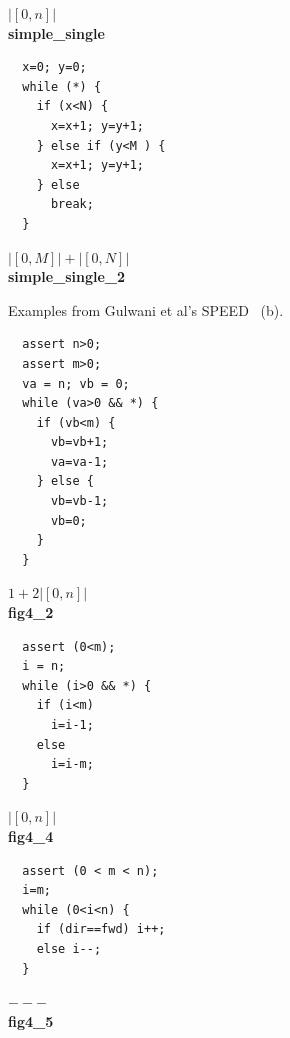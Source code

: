 \documentclass[nocopyrightspace,preprint,pldi]{sigplanconf-pldi15}
\begin{document}
{\begin{figure}
\begin{minipage}[b]{\progwidth}
\begin{center}
$|[0,n]|$
\\[.7\baselineskip]
      {\bf simple\_single}
    \end{center}
  \end{minipage}
%
%
  \begin{minipage}[b]{\progwidth}
    \begin{center}
   \begin{lstlisting}
  x=0; y=0;
  while (*) {
    if (x<N) {
      x=x+1; y=y+1;
    } else if (y<M ) {
      x=x+1; y=y+1;
    } else
      break;
  }
   \end{lstlisting}

$|[0, M]| + |[0, N]|$
\\[.7\baselineskip]
      {\bf simple\_single\_2}
    \end{center}
  \end{minipage}

   \caption{Examples from Gulwani et al's SPEED~\cite{GulwaniMC09} (b).}
  \label{fig:cat2b}
\end{figure}





\begin{figure}
 \setlength{\progwidth}{.24\linewidth}
  \centering
%
%
  \begin{minipage}[b]{\progwidth}
    \begin{center}
   \begin{lstlisting}
  assert n>0;
  assert m>0;
  va = n; vb = 0;
  while (va>0 && *) {
    if (vb<m) {
      vb=vb+1;
      va=va-1;
    } else {
      vb=vb-1;
      vb=0;
    }
  }
   \end{lstlisting}
$1 + 2|[0, n]|$
\\[.7\baselineskip]
      {\bf fig4\_2}
    \end{center}
  \end{minipage}
%
%
%
%
  \begin{minipage}[b]{\progwidth}
    \begin{center}
   \begin{lstlisting}
  assert (0<m);
  i = n;
  while (i>0 && *) {
    if (i<m)
      i=i-1;
    else
      i=i-m;
  }
   \end{lstlisting}
$|[0, n]|$
\\[.7\baselineskip]
      {\bf fig4\_4}
    \end{center}
  \end{minipage}
%
%
  \begin{minipage}[b]{\progwidth}
    \begin{center}
   \begin{lstlisting}
  assert (0 < m < n);
  i=m;
  while (0<i<n) {
    if (dir==fwd) i++;
    else i--;
  }
   \end{lstlisting}
$---$
\\[.7\baselineskip]
      {\bf fig4\_5}
    \end{center}
  \end{minipage}


\end{figure}}
\end{document}

